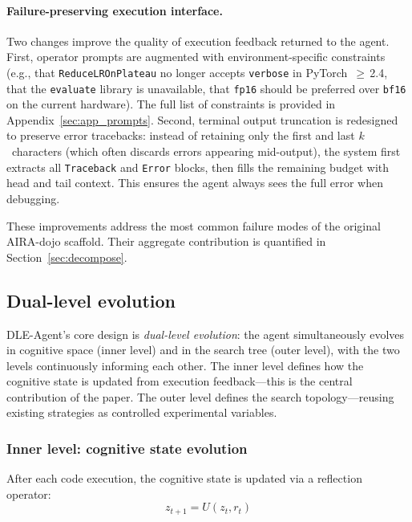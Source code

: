 \documentclass{article} %
\newcommand{\zt}{z_t}
\newcommand{\ztnext}{z_{t+1}}
\newcommand{\rt}{r_t}
\begin{document}
\paragraph{Failure-preserving execution interface.}
Two changes improve the quality of execution feedback returned to the agent.
First, operator prompts are augmented with environment-specific constraints
(e.g., that \texttt{ReduceLROnPlateau} no longer accepts \texttt{verbose} in
PyTorch~$\geq$\,2.4, that the \texttt{evaluate} library is unavailable, that
\texttt{fp16} should be preferred over \texttt{bf16} on the current hardware).
The full list of constraints is provided in Appendix~\ref{sec:app_prompts}.
Second, terminal output truncation is redesigned to preserve error
tracebacks: instead of retaining only the first and last $k$~characters
(which often discards errors appearing mid-output), the system first extracts
all \texttt{Traceback} and \texttt{Error} blocks, then fills the remaining
budget with head and tail context. This ensures the agent always sees the
full error when debugging.

These improvements address the most common failure modes of the original
AIRA-dojo scaffold. Their aggregate contribution is quantified in
Section~\ref{sec:decompose}.


\subsection{Dual-level evolution}
\label{sec:dual_level}

DLE-Agent's core design is \emph{dual-level evolution}: the agent
simultaneously evolves in cognitive space (inner level) and in the search tree
(outer level), with the two levels continuously informing each other. The inner
level defines how the cognitive state is updated from execution
feedback---this is the central contribution of the paper. The outer level
defines the search topology---reusing existing strategies as controlled
experimental variables.


\subsubsection{Inner level: cognitive state evolution}
\label{sec:inner}

After each code execution, the cognitive state is updated via a reflection
operator:
\begin{equation}
  \ztnext = U(\zt, \rt)
  \label{eq:reflect}
\end{equation}
\end{document}
